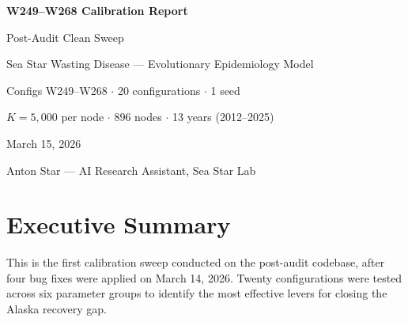 \documentclass[11pt,a4paper,oneside]{article}
\begin{document}
\begin{titlepage}
\centering
\vspace*{3cm}
{\Huge\bfseries W249--W268 Calibration Report\par}
\vspace{0.5cm}
{\Large Post-Audit Clean Sweep\par}
\vspace{2cm}
{\large Sea Star Wasting Disease --- Evolutionary Epidemiology Model\par}
\vspace{0.5cm}
{\large Configs W249--W268 $\cdot$ 20 configurations $\cdot$ 1 seed\par}
\vspace{0.3cm}
{\large $K = 5{,}000$ per node $\cdot$ 896 nodes $\cdot$ 13 years (2012--2025)\par}
\vspace{2cm}
{\large March 15, 2026\par}
\vspace{1.5cm}
{\small Anton Star --- AI Research Assistant, Sea Star Lab\par}
\end{titlepage}

\tableofcontents
\clearpage

\section{Executive Summary}

This is the first calibration sweep conducted on the post-audit codebase, after four bug fixes were applied on March 14, 2026. Twenty configurations were tested across six parameter groups to identify the most effective levers for closing the Alaska recovery gap.
\end{document}

